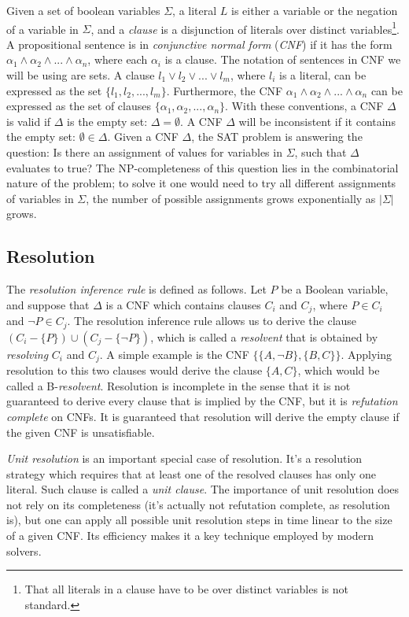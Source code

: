 \documentclass[12pt]{diicc}
\begin{document}
Given a set of boolean variables $\Sigma$, a literal $L$ is either a variable or the negation of a variable in $\Sigma$, and a \textit{clause} is a disjunction of literals over distinct variables\footnote[1]{That all literals in a clause have to be over distinct variables is not standard.}. A propositional sentence is in \textit{conjunctive normal form} (\textit{CNF}) if it has the form $\alpha_{1} \wedge \alpha_{2} \wedge ... \wedge \alpha_{n}$, where each $\alpha_{i}$ is a clause. The notation of sentences in CNF we will be using are sets. A clause $l_{1} \vee l_{2} \vee ... \vee l_{m}$, where $l_{i}$ is a literal, can be expressed as the set $\{l_{1},l_{2},...,l_{m}\}$. Furthermore, the CNF $\alpha_{1} \wedge \alpha_{2} \wedge ... \wedge \alpha_{n}$ can be expressed as the set of clauses $\{\alpha_{1},\alpha_{2},...,\alpha_{n}\}$. With these conventions, a CNF $\Delta$ is valid if $\Delta$ is the empty set: $\Delta = \emptyset$. A CNF $\Delta$ will be inconsistent if it contains the empty set: $\emptyset \in \Delta$. 
Given a CNF $\Delta$, the SAT problem is answering the question: Is there an assignment of values for variables in $\Sigma$, such that $\Delta$ evaluates to true? The NP-completeness of this question lies in the combinatorial nature of the problem; to solve it one would need to try all different assignments of variables in $\Sigma$, the number of possible assignments grows exponentially as $|\Sigma|$ grows.

\subsection{Resolution}
The \textit{resolution inference rule} \cite{Rob65} is defined as follows. Let $P$ be a Boolean variable, and suppose that $\Delta$ is a CNF which contains clauses $C_{i}$ and $C_{j}$, where $P \in C_{i}$ and $\neg P \in C_{j}$. The resolution inference rule allows us to derive the clause $(C_{i}-\{P\})\cup (C_{j}-\{\neg P\})$, which is called a \textit{resolvent} that is obtained by \textit{resolving} $C_{i}$ and $C_{j}$. A simple example is the CNF $\{\{A,\neg B\},\{B,C\}\}$. Applying resolution to this two clauses would derive the clause $\{A,C\}$, which would be called a B-\textit{resolvent}.
Resolution is incomplete in the sense that it is not guaranteed to derive every clause that is implied by the CNF, but it is \textit{refutation complete} on CNFs. It is guaranteed that resolution will derive the empty clause if the given CNF is unsatisfiable. 

\textit{Unit resolution} is an important special case of resolution. It's a resolution strategy which requires that at least one of the resolved clauses has only one literal. Such clause is called a \textit{unit clause}. The importance of unit resolution does not rely on its completeness (it's actually not refutation complete, as resolution is), but one can apply all possible unit resolution steps in time linear to the size of a given CNF. Its efficiency makes it a key technique employed by modern solvers.
\end{document}
